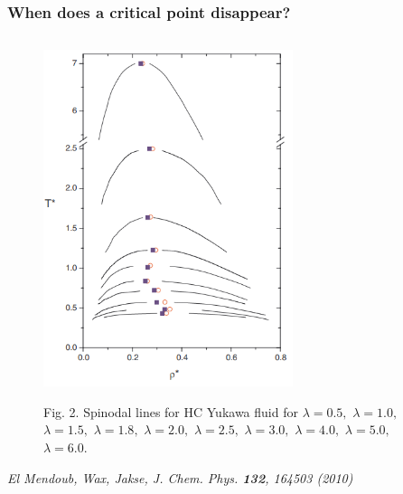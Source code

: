 \documentclass[8pt]{beamer}
\begin{document}
	\begin{frame}
		\frametitle{When does a critical point disappear?}
		
		\begin{columns}
			\begin{column}{0.5\textwidth}
				\begin{figure}[htbp]
					\includegraphics[width=0.65\textwidth,angle=0]{limit_cp_spinodals} \\
					\parbox{1.0\textwidth}{\caption*{Fig. 2. Spinodal lines for HC Yukawa fluid for $\lambda = 0.5,$ $\lambda = 1.0,$ $\lambda = 1.5,$ $\lambda = 1.8,$ $\lambda = 2.0,$ $\lambda = 2.5,$ $\lambda = 3.0,$ $\lambda = 4.0,$ $\lambda = 5.0,$ $\lambda = 6.0$.
					}}
				\end{figure}
				
				\textit{El Mendoub, Wax, Jakse, J. Chem. Phys. \textbf{132}, 164503 (2010)}
			\end{column}
			

\end{columns}
\end{frame}
\end{document}
